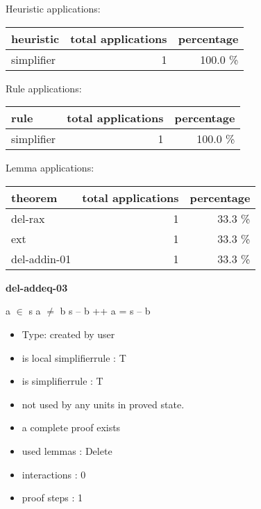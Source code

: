 \documentclass[a4paper]{article}
\begin{document}
\medskip


Heuristic applications:

\begin{supertabular}{l|r|r}
heuristic	& total applications & percentage \\ \hline
simplifier & 1 & 100.0 \% \\

\end{supertabular}

Rule applications:

\begin{supertabular}{l|r|r}
rule	        & total applications & percentage \\ \hline
simplifier & 1 & 100.0 \% \\

\end{supertabular}

Lemma applications:

\begin{supertabular}{l|r|r}
theorem	        & total applications & percentage \\ \hline
del-rax & 1 & 33.3 \% \\
ext & 1 & 33.3 \% \\
del-addin-01 & 1 & 33.3 \% \\

\end{supertabular}
\pagebreak

{\LARGE\bf del-addeq-03}\label{lemma-del-addeq-03}

\medskip

 \Fol a $\in$ s \And a $\neq$ b \Imp s -- b ++ a = s -- b

\begin{itemize}

\item Type: created by user

\item is local simplifierrule : T
\item is simplifierrule : T
\item not used by any units in proved state.
\item       a complete proof exists
\item       used lemmas  : Delete
\item       interactions : 0
\item       proof steps  : 1
\end{itemize}

\medskip
\end{document}
